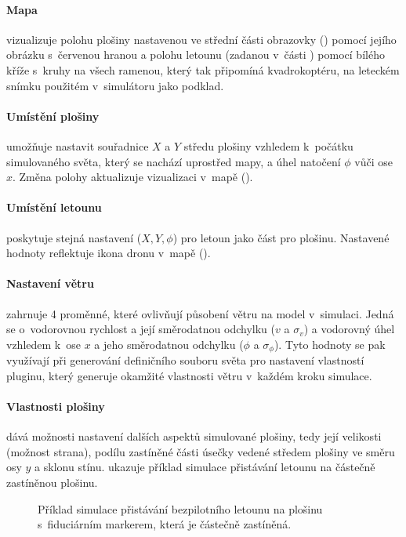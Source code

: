     \paragraph{ Mapa}vizualizuje polohu plošiny nastavenou ve střední části obrazovky () pomocí jejího obrázku s~červenou hranou a polohu letounu (zadanou v~části ) pomocí bílého kříže s~kruhy na všech ramenou, který tak připomíná kvadrokoptéru, na leteckém snímku použitém v~simulátoru jako podklad.

    \paragraph{ Umístění plošiny} umožňuje nastavit souřadnice $X$ a $Y$ středu plošiny vzhledem k~počátku simulovaného světa, který se nachází uprostřed mapy, a úhel natočení $\phi$ vůči ose $x$. Změna polohy aktualizuje vizualizaci v~mapě ().

    \paragraph{ Umístění letounu} poskytuje stejná nastavení ($X, Y, \phi$) pro letoun jako část  pro plošinu. Nastavené hodnoty reflektuje ikona dronu v~mapě ().

    \paragraph{ Nastavení větru} zahrnuje 4 proměnné, které ovlivňují působení větru na model v~simulaci. Jedná se o~vodorovnou rychlost a její směrodatnou odchylku ($v$ a $\sigma_v$) a vodorovný úhel vzhledem k~ose $x$ a jeho směrodatnou odchylku ($\phi$ a $\sigma_\phi$). Tyto hodnoty se pak využívají při generování definičního souboru světa pro nastavení vlastností pluginu, který generuje okamžité vlastnosti větru v~každém kroku simulace.

    \paragraph{ Vlastnosti plošiny} dává možnosti nastavení dalších aspektů simulované plošiny, tedy její velikosti (možnost strana), podílu zastíněné části úsečky vedené středem plošiny ve směru osy $y$ a sklonu stínu.  ukazuje příklad simulace přistávání letounu na částečně zastíněnou plošinu.
    \begin{figure}
        \centering
        \caption[Přistávání na zastíněnou plošinu]{Příklad simulace přistávání bezpilotního letounu na plošinu s~fiduciárním markerem, která je částečně zastíněná.}
        \label{fig:stin}
    \end{figure}

